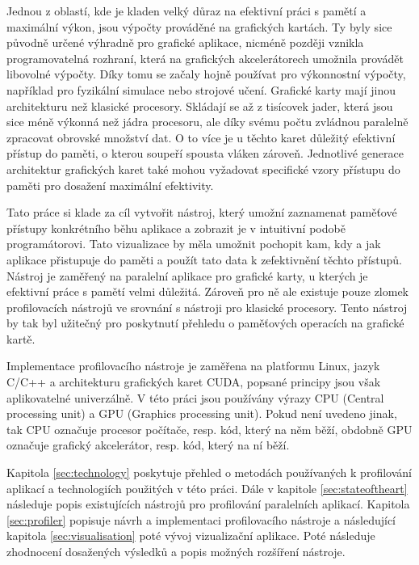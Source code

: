 Jednou z oblastí, kde je kladen velký důraz na efektivní práci s pamětí a maximální výkon, jsou výpočty prováděné na grafických kartách. Ty byly sice původně určené výhradně pro grafické aplikace, nicméně později vznikla programovatelná rozhraní, která na grafických akcelerátorech umožnila provádět libovolné výpočty. Díky tomu se začaly hojně používat pro výkonnostní výpočty, například pro fyzikální simulace nebo strojové učení. Grafické karty mají jinou architekturu než klasické procesory. Skládají se až z tisícovek jader, která jsou sice méně výkonná než jádra procesoru, ale díky svému počtu zvládnou paralelně zpracovat obrovské množství dat. O to více je u těchto karet důležitý efektivní přístup do paměti, o kterou soupeří spousta vláken zároveň. Jednotlivé generace architektur grafických karet také mohou vyžadovat specifické vzory přístupu do paměti pro dosažení maximální efektivity.

Tato práce si klade za cíl vytvořit nástroj, který umožní zaznamenat paměťové přístupy konkrétního běhu aplikace a zobrazit je v intuitivní podobě programátorovi. Tato vizualizace by měla umožnit pochopit kam, kdy a jak aplikace přistupuje do paměti a použít tato data k zefektivnění těchto přístupů. Nástroj je zaměřený na paralelní aplikace pro grafické karty, u kterých je efektivní práce s pamětí velmi důležitá. Zároveň pro ně ale existuje pouze zlomek profilovacích nástrojů ve srovnání s nástroji pro klasické procesory. Tento nástroj by tak byl užitečný pro poskytnutí přehledu o paměťových operacích na grafické kartě.

Implementace profilovacího nástroje je zaměřena na platformu Linux, jazyk C/C++ a architekturu grafických karet CUDA, popsané principy jsou však aplikovatelné univerzálně. V této práci jsou používány výrazy CPU (Central processing unit) a GPU (Graphics processing unit). Pokud není uvedeno jinak, tak CPU označuje procesor počítače, resp. kód, který na něm běží, obdobně GPU označuje grafický akcelerátor, resp. kód, který na ní běží.

Kapitola \ref{sec:technology} poskytuje přehled o metodách používaných k profilování aplikací a technologiích použitých v této práci. Dále v kapitole \ref{sec:stateoftheart} následuje popis existujících nástrojů pro profilování paralelních aplikací. Kapitola \ref{sec:profiler} popisuje návrh a implementaci profilovacího nástroje a následující kapitola \ref{sec:visualisation} poté vývoj vizualizační aplikace. Poté následuje zhodnocení dosažených výsledků a popis možných rozšíření nástroje. 
